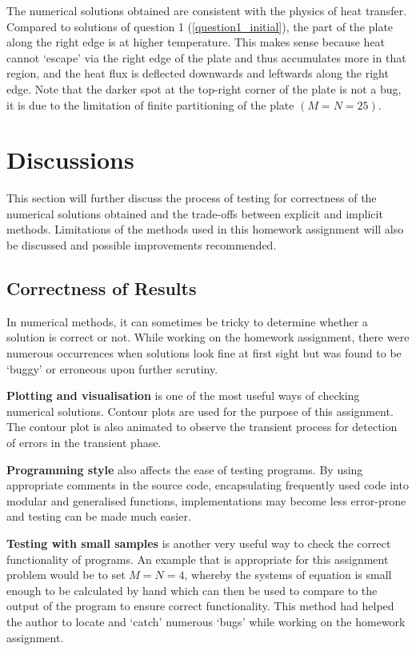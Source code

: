 \documentclass[a4paper]{article}
\begin{document}
	The numerical solutions obtained are consistent with the physics of heat transfer. Compared to solutions of question 1 (\autoref{question1_initial}), the part of the plate along the right edge is at higher temperature. This makes sense because heat cannot `escape' via the right edge of the plate and thus accumulates more in that region, and the heat flux is deflected downwards and leftwards along the right edge. Note that the darker spot at the top-right corner of the plate is not a bug, it is due to the limitation of finite partitioning of the plate $(M=N=25)$.
	
\section{Discussions}
\label{discussion_section}
	This section will further discuss the process of testing for correctness of the numerical solutions obtained and the trade-offs between explicit and implicit methods. Limitations of the methods used in this homework assignment will also be discussed and possible improvements recommended.
	
	\subsection{Correctness of Results}
		In numerical methods, it can sometimes be tricky to determine whether a solution is correct or not. While working on the homework assignment, there were numerous occurrences when solutions look fine at first sight but was found to be `buggy' or erroneous upon further scrutiny.
	
		\textbf{Plotting and visualisation} is one of the most useful ways of checking numerical solutions. Contour plots are used for the purpose of this assignment. The contour plot is also animated to observe the transient process for detection of errors in the transient phase.
		
		\textbf{Programming style} also affects the ease of testing programs. By using appropriate comments in the source code, encapsulating frequently used code into modular and generalised functions, implementations may become less error-prone and testing can be made much easier.
		
		\textbf{Testing with small samples} is another very useful way to check the correct functionality of programs. An example that is appropriate for this assignment problem would be to set $M=N=4$, whereby the systems of equation is small enough to be calculated by hand which can then be used to compare to the output of the program to ensure correct functionality. This method had helped the author to locate and `catch' numerous `bugs' while working on the homework assignment.
		
\end{document}
